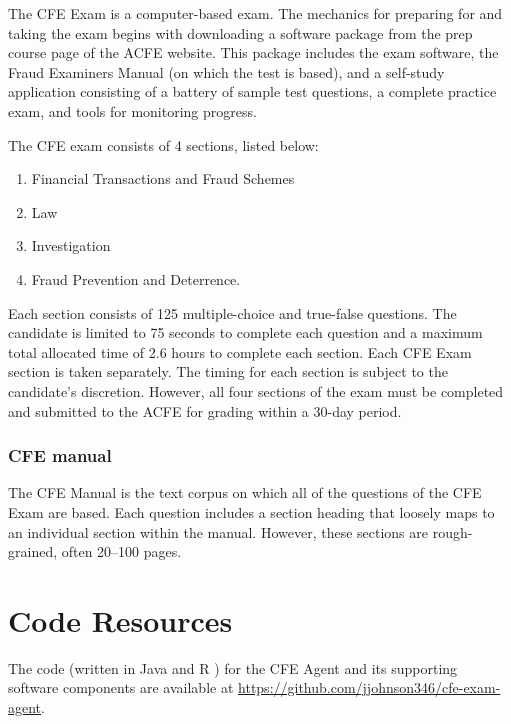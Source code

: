 The CFE Exam is a computer-based exam.  The mechanics for preparing for and taking the exam begins with downloading a software package from the prep course page of the ACFE website.  This package includes the exam software, the Fraud Examiners Manual (on which the test is based), and a self-study application consisting of a battery of sample test questions, a complete practice exam, and tools for monitoring progress.  

The CFE exam consists of 4 sections, listed below:

\begin{enumerate}
\item Financial Transactions and Fraud Schemes 
\item Law 
\item Investigation
\item Fraud Prevention and Deterrence.  
\end{enumerate}

Each section consists of 125 multiple-choice and true-false questions.  The candidate is limited to 75 seconds to complete each question and a maximum total allocated time of 2.6 hours to complete each section.  Each CFE Exam section is taken separately.  The timing for each section is subject to the candidate’s discretion.  However, all four sections of the exam must be completed and submitted to the ACFE for grading within a 30-day period.

\subsubsection{CFE manual}

The CFE Manual is the text corpus on which all of the questions of the CFE Exam are based.  Each question includes a section heading that loosely maps to an individual section within the manual.  However, these sections are rough-grained, often 20--100 pages.  

\section{Code Resources}

The code (written in Java \cite{java_software} and R \cite{r_software}) for the CFE Agent and its supporting software components are available at \url{https://github.com/jjohnson346/cfe-exam-agent}.








